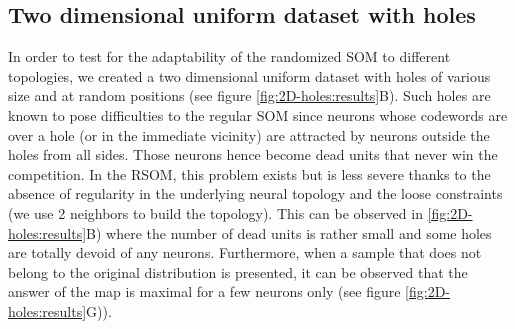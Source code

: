 \subsection{Two dimensional uniform dataset with holes}
\label{sec:2d-holes}

In order to test for the adaptability of the randomized SOM to different topologies, we created a two dimensional uniform dataset with holes of various size and at random positions (see figure \ref{fig:2D-holes:results}B). Such holes are known to pose difficulties to the regular SOM since neurons whose codewords are over a hole (or in the immediate vicinity) are attracted by neurons outside the holes from all sides. Those neurons hence become dead units that never win the competition. In the RSOM, this problem exists but is less severe thanks to the absence of regularity in the underlying neural topology and the loose constraints (we use 2 neighbors to build the topology). This can be observed in \ref{fig:2D-holes:results}B) where the number of dead units is rather small and some holes are totally devoid of any neurons. Furthermore, when a sample that does not belong to the original distribution is presented, it can be observed that the answer of the map is maximal for a few neurons only (see figure \ref{fig:2D-holes:results}G)).



